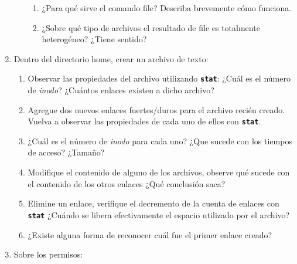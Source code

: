 \documentclass[12pt]{article}
\newcommand{\code}[1]{\textbf{\tt #1}}
\begin{document}
\begin{enumerate}
\begin{enumerate}
            \begin{enumerate}

                \item   ¿Para qué sirve el comando file? Describa brevemente
                    cómo funciona.

                \item   ¿Sobre qué tipo de archivos el resultado de file es
                    totalmente heterogéneo? ¿Tiene sentido?

            \end{enumerate}

    \end{enumerate}

    \item   Dentro del directorio home, crear un archivo de texto:

        \begin{enumerate}

            \item Observar las propiedades del archivo utilizando \code{stat}:
                ¿Cuál es el número de \emph{inodo}? ¿Cuántos enlaces existen a
                dicho archivo?

            \item Agregue dos nuevos enlaces fuertes/duros para el archivo
                recién creado. Vuelva a observar las propiedades de cada uno
                de ellos con \code{stat}.

            \item ¿Cuál es el número de \emph{inodo} para cada uno? ¿Que
                sucede con los tiempos de acceso? ¿Tamaño?

            \item Modifique el contenido de alguno de los archivos, observe
                qué sucede con el contenido de los otros enlaces ¿Qué
                conclusión saca?

            \item Elimine un enlace, verifique el decremento de la cuenta de
                enlaces con \code{stat} ¿Cuándo se libera efectivamente el
                espacio utilizado por el archivo?

            \item ¿Existe alguna forma de reconocer cuál fue el primer enlace
                creado?

        \end{enumerate}

    \item   Sobre los permisos:


\end{enumerate}
\end{document}

